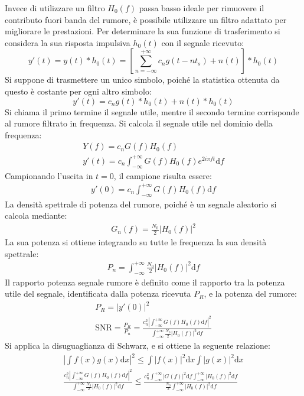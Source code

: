 \documentclass{article}
\newcommand{\df}{\mathrm{d}}
\newcommand{\intinf}{\displaystyle\int_{-\infty}^{+\infty}}
\numberwithin{equation}{subsection}
\begin{document}
Invece di utilizzare un filtro $H_0(f)$ passa basso ideale per rimuovere il contributo fuori banda del rumore, è possibile utilizzare un filtro 
adattato per migliorare le prestazioni. Per determinare la sua funzione di trasferimento si considera la sua risposta impulsiva $h_0(t)$ con il 
segnale ricevuto:
\begin{equation*}
    y'(t)=y(t)*h_0(t)=\displaystyle\left[\sum_{n=-\infty}^{+\infty}c_ng(t-nt_s)+n(t)\right]*h_0(t)
\end{equation*}
Si suppone di trasmettere un unico simbolo, poiché la statistica ottenuta da questo è costante per ogni altro simbolo:
\begin{equation*}
    y'(t)=c_ng(t)*h_0(t)+n(t)*h_0(t)
\end{equation*}
Si chiama il primo termine il segnale utile, mentre il secondo termine corrisponde al rumore filtrato in frequenza. 
Si calcola il segnale utile nel dominio della frequenza:
\begin{gather*}
    Y(f)=c_nG(f)H_0(f)\\
    y'(t)=c_n\intinf G(f)H_0(f)e^{2i\pi ft}\df f
\end{gather*}
Campionando l'uscita in $t=0$, il campione risulta essere:
\begin{gather*}
    y'(0)=c_n\intinf G(f)H_0(f)\df f
\end{gather*}
La densità spettrale di potenza del rumore, poiché è un segnale aleatorio si calcola mediante:
\begin{gather*}
    G_n(f)=\displaystyle\frac{N_0}{2}|H_0(f)|^2
\end{gather*}
La sua potenza si ottiene integrando su tutte le frequenza la sua densità spettrale:
\begin{gather*}
    P_n=\intinf \frac{N_0}{2}|H_0(f)|^2\df f
\end{gather*}
Il rapporto potenza segnale rumore è definito come il rapporto tra la potenza utile del segnale, identificata dalla potenza ricevuta $P_R$, e la potenza del rumore:
\begin{gather*}
    P_R=|y'(0)|^2\\
    \mathrm{SNR}=\displaystyle\frac{P_R}{P_n}=\frac{c_n^2\left|\intinf G(f)H_0(f)\df f\right|^2}{\intinf \frac{N_0}{2}|H_0(f)|^2\df f}
\end{gather*}
Si applica la disuguaglianza di Schwarz, e si ottiene la seguente relazione:
\begin{gather*}
    \displaystyle\left|\int f(x)g(x)\df x\right|^2\leq \int |f(x)|^2\df x\int|g(x)|^2\df x\\
    \displaystyle\frac{c_n^2\left|\intinf G(f)H_0(f)\df f\right|^2}{\intinf \frac{N_0}{2}|H_0(f)|^2\df f}\leq \frac{c_n^2\intinf |G(f)|^2\df f\intinf |H_0(f)|^2\df f}{\displaystyle\frac{N_0}{2}\intinf |H_0(f)|^2\df f}
\end{gather*}
\end{document}

